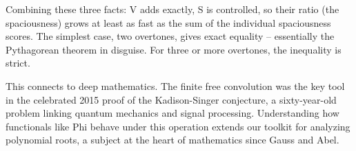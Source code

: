 Combining these three facts: V adds exactly, S is controlled, so
their ratio (the spaciousness) grows at least as fast as the sum of
the individual spaciousness scores. The simplest case, two overtones,
gives exact equality -- essentially the Pythagorean theorem in
disguise. For three or more overtones, the inequality is strict.

This connects to deep mathematics. The finite free convolution was
the key tool in the celebrated 2015 proof of the Kadison-Singer
conjecture, a sixty-year-old problem linking quantum mechanics and
signal processing. Understanding how functionals like Phi behave
under this operation extends our toolkit for analyzing polynomial
roots, a subject at the heart of mathematics since Gauss and Abel.
